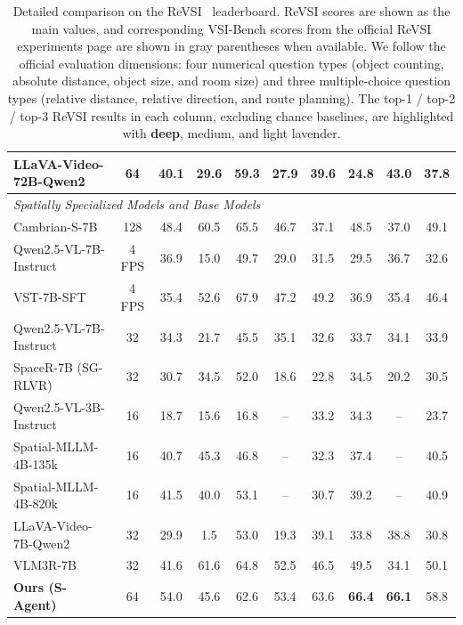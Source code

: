 \documentclass{llmxive}
\providecommand{\cone}[1]{\cellcolor{top1color}\textbf{#1}}
\providecommand{\ctwo}[1]{\cellcolor{top2color}#1}
\providecommand{\cthree}[1]{\cellcolor{top3color}#1}
\begin{document}
\begin{table}[t]
{\begin{tabular}{lc|cccc|ccc|c}
        LLaVA-Video-72B-Qwen2 & 64 & 40.1 & 29.6 & 59.3 & 27.9 & 39.6 & 24.8 & 43.0 & 37.8 \\
        \midrule
        \multicolumn{10}{l}{\textit{Spatially Specialized Models and Base Models}} \\
        Cambrian-S-7B & 128 & 48.4 & 60.5 & 65.5 & 46.7 & 37.1 & 48.5 & 37.0 & 49.1 \\
        Qwen2.5-VL-7B-Instruct & 4 FPS & 36.9 & 15.0 & 49.7 & 29.0 & 31.5 & 29.5 & 36.7 & 32.6 \\
        VST-7B-SFT & 4 FPS & 35.4 & 52.6 & 67.9 & 47.2 & 49.2 & 36.9 & 35.4 & 46.4 \\
        Qwen2.5-VL-7B-Instruct & 32 & 34.3 & 21.7 & 45.5 & 35.1 & 32.6 & 33.7 & 34.1 & 33.9 \\
        SpaceR-7B (SG-RLVR) & 32 & 30.7 & 34.5 & 52.0 & 18.6 & 22.8 & 34.5 & 20.2 & 30.5 \\
        Qwen2.5-VL-3B-Instruct & 16 & 18.7 & 15.6 & 16.8 & -- & 33.2 & 34.3 & -- & 23.7 \\
        Spatial-MLLM-4B-135k & 16 & 40.7 & 45.3 & 46.8 & -- & 32.3 & 37.4 & -- & 40.5 \\
        Spatial-MLLM-4B-820k & 16 & 41.5 & 40.0 & 53.1 & -- & 30.7 & 39.2 & -- & 40.9 \\
        LLaVA-Video-7B-Qwen2 & 32 & 29.9 & 1.5 & 53.0 & 19.3 & 39.1 & 33.8 & 38.8 & 30.8 \\
        VLM3R-7B & 32 & 41.6 & \ctwo{61.6} & 64.8 & 52.5 & 46.5 & \cthree{49.5} & 34.1 & 50.1 \\
        \midrule
        \textbf{Ours (S-Agent)} & 64 & 54.0 & 45.6 & 62.6 & 53.4 & \cthree{63.6} & \cone{66.4} & \cone{66.1} & \ctwo{58.8} \\
        \bottomrule
    \end{tabular}%
    }
\caption{Detailed comparison on the ReVSI~\cite{revsi} leaderboard. ReVSI scores are shown as the main values, and corresponding VSI-Bench scores from the official ReVSI experiments page are shown in gray parentheses when available. We follow the official evaluation dimensions: four numerical question types (object counting, absolute distance, object size, and room size) and three multiple-choice question types (relative distance, relative direction, and route planning). The top-1 / top-2 / top-3 ReVSI results in each column, excluding chance baselines, are highlighted with \colorbox{top1color}{\textbf{deep}}, \colorbox{top2color}{medium}, and \colorbox{top3color}{light} lavender.}
\end{table}
\end{document}
